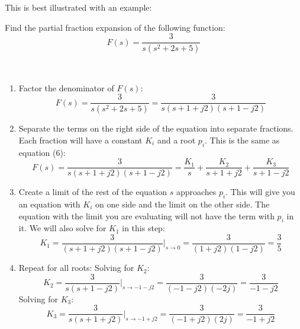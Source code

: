 \documentclass{article}
\theoremstyle{mytheoremstyle}
\theoremstyle{mytheoremstyle}
\theoremstyle{myproblemstyle}
\theoremstyle{break}
\begin{document}
This is best illustrated with an example:

\begin{problem}
Find the partial fraction expansion of the following function:
\begin{equation}
	F(s) = \frac{3}{s(s^2 + 2s + 5)}
\end{equation}
\end{problem}



\begin{solution}[\textcolor{blue}{Repeated Real Roots}]~
	\begin{enumerate}
		\item Factor the denominator of $F(s)$:
		      \begin{equation}
			      F(s) = \frac{3}{s(s^2 + 2s + 5)} = \frac{3}{s(s+1+j2)(s+1-j2)}
		      \end{equation}
		\item Separate the terms on the right side of the equation into separate fractions. Each fraction will have a constant $K_i$ and a root $p_i$. This is the same as equation (6):
		      \begin{equation}
			      F(s) = \frac{3}{s(s+1+j2)(s+1-j2)} = \frac{K_1}{s} + \frac{K_2}{s+1+j2} + \frac{K_3}{s+1-j2}
		      \end{equation}
		\item Create a limit of the rest of the equation $s$ approaches $p_i$. This will give you an equation with $K_i$ on one side and the limit on the other side. The equation with the limit you are evaluating will not have the term with $p_i$ in it. We will also solve for $K_1$ in this step:
		      \begin{equation}
			      K_1 = \frac{3}{(s+1+j2)(s+1-j2)} \Big|_{s \to 0} = \frac{3}{(1+j2)(1-j2)} = \frac{3}{5}
		      \end{equation}
		\item Repeat for all roots:
		      \subitem Solving for $K_2$:
		      \begin{equation}
			      K_2 = \frac{3}{s(s+1-j2)} \Big|_{s \to -1-j2} = \frac{3}{(-1-j2)(-2j)} = \frac{3}{-1-j2}
		      \end{equation}
		      \subitem Solving for $K_3$:
		      \begin{equation}
			      K_3 = \frac{3}{s(s+1+j2)} \Big|_{s \to -1+j2} = \frac{3}{(-1+j2)(2j)} = \frac{3}{-1+j2}
	\end{equation}
	\end{enumerate}
\end{solution}
\end{document}
